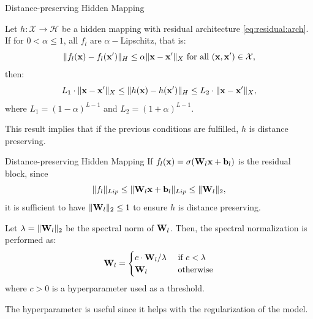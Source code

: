 \documentclass[xcolor=table]{beamer}
\DeclarePairedDelimiter\norm{\lVert}{\rVert}%
\begin{document}
\begin{frame}{Distance-preserving Hidden Mapping}
    \begin{proposition}
    Let \(h: \mathcal X \to \mathcal H\) be a hidden mapping with residual architecture \eqref{eq:residual:arch}. If for \(0 < \alpha \leq 1\), all \(f_l\) are \(\alpha-\)Lipschitz, that is: 
    \[
    \norm{f_l(\bx) - f_l(\bx')}_H \leq \alpha \norm{\bx - \bx'}_X\text{ for all } (\bx,\bx') \in \mathcal X,
    \]
    then:
    \[
    L_1 \cdot \norm{\bx - \bx'}_X \leq \norm{h(\bx) - h(\bx')}_H \leq L_2 \cdot \norm{\bx - \bx'}_X,
    \]
    where \(L_1 = (1-\alpha)^{L-1}\) and \(L_2 = (1+\alpha)^{L-1}\).
    \end{proposition}
    This result implies that if the previous conditions are fulfilled, \(h\) is distance preserving.
\end{frame}

\begin{frame}{Distance-preserving Hidden Mapping}
If \(f_l({\mathbf x}) = \sigma({\mathbf W}_l {\mathbf x} + {\mathbf b}_l)\) is the residual block, since
\[
\norm{f_l}_{Lip} \leq \norm{\bW_l \bx + \bb_l}_{Lip} \leq \norm{\bW_l}_2,
\]
it is sufficient to have \(\norm{\bW_l}_2 \leq 1\) to ensure \(h\) is distance preserving.
\pause
\begin{definition}
    Let \(\lambda = \norm{\bW_l}_2\) be the spectral norm of \({\mathbf W}_l\). Then, the spectral normalization is performed as:
\begin{equation}\label{eq:spectral:normal}
    {\mathbf W}_l = \begin{cases} c \cdot {\mathbf W}_l / \lambda & \text{ if } c < \lambda \\
    {\mathbf W}_l & \text{ otherwise}
    \end{cases}
\end{equation}
where \(c > 0\) is a hyperparameter used as a threshold.
\end{definition}

The hyperparameter is useful since it helps with the regularization of the model.

\end{frame}
\end{document}
